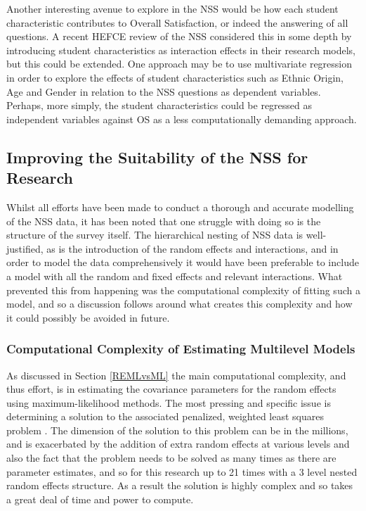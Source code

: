 \documentclass[11pt,a4paper]{report}
\begin{document}
Another interesting avenue to explore in the NSS would be how each student characteristic contributes to Overall Satisfaction, or indeed the answering of all questions. A recent HEFCE review of the NSS considered this in some depth by introducing student characteristics as interaction effects in their research models, but this could be extended. One approach may be to use multivariate regression in order to explore the effects of student characteristics such as Ethnic Origin, Age and Gender in relation to the NSS questions as dependent variables. Perhaps, more simply, the student characteristics could be regressed as independent variables against OS as a less computationally demanding approach. 


\subsection{Improving the Suitability of the NSS for Research} \label{ImprovingNSS}
Whilst all efforts have been made to conduct a thorough and accurate modelling of the NSS data, it has been noted that one struggle with doing so is the structure of the survey itself. The hierarchical nesting of NSS data is well-justified, as is the introduction of the random effects and interactions, and in order to model the data comprehensively it would have been preferable to include a model with all the random and fixed effects and relevant interactions. What prevented this from happening was the computational complexity of fitting such a model, and so a discussion follows around what creates this complexity and how it could possibly be avoided in future. 

\subsubsection{Computational Complexity of Estimating Multilevel Models}

As discussed in Section \ref{REMLvsML} the main computational complexity, and thus effort, is in estimating the covariance parameters for the random effects using maximum-likelihood methods. The most pressing and specific issue is determining a solution to the associated penalized, weighted least squares problem \cite{bates2014fitting}. The dimension of the solution to this problem can be in the millions, and is exacerbated by the addition of extra random effects at various levels and also the fact that the problem needs to be solved as many times as there are parameter estimates, and so for this research up to 21 times with a 3 level nested random effects structure. As a result the solution is highly complex and so takes a great deal of time and power to compute. 
\end{document}
